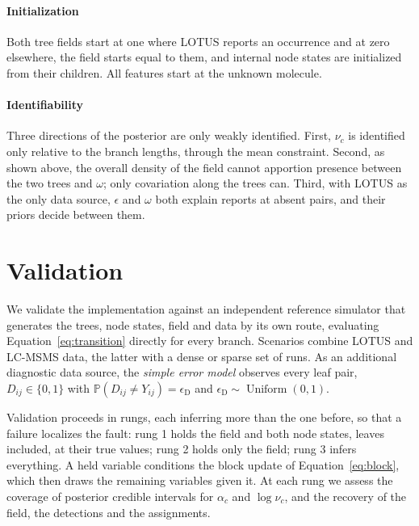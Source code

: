 \documentclass[
11pt, %
oneside, %
english, %
singlespacing, %
headsepline, %
chapterinoneline, %
]{MastersDoctoralThesis} %
\DeclareMathOperator{\Unif}{Uniform}
\def\P{\mathbb{P}}
\begin{document}
\paragraph{Initialization} Both tree fields start at one where LOTUS reports an occurrence and at zero elsewhere, the field starts equal to them, and internal node states are initialized from their children. All features start at the unknown molecule.

\paragraph{Identifiability} Three directions of the posterior are only weakly identified. First, $\nu_c$ is identified only relative to the branch lengths, through the mean constraint. Second, as shown above, the overall density of the field cannot apportion presence between the two trees and $\omega$; only covariation along the trees can. Third, with LOTUS as the only data source, $\epsilon$ and $\omega$ both explain reports at absent pairs, and their priors decide between them.

\section{Validation}

We validate the implementation against an independent reference simulator that generates the trees, node states, field and data by its own route, evaluating Equation~\eqref{eq:transition} directly for every branch. Scenarios combine LOTUS and LC-MSMS data, the latter with a dense or sparse set of runs. As an additional diagnostic data source, the \emph{simple error model} observes every leaf pair, $D_{ij} \in \{0,1\}$ with $\P(D_{ij} \neq Y_{ij}) = \epsilon_{\mathrm{D}}$ and $\epsilon_{\mathrm{D}} \sim \Unif(0,1)$.

Validation proceeds in rungs, each inferring more than the one before, so that a failure localizes the fault: rung 1 holds the field and both node states, leaves included, at their true values; rung 2 holds only the field; rung 3 infers everything. A held variable conditions the block update of Equation~\eqref{eq:block}, which then draws the remaining variables given it. At each rung we assess the coverage of posterior credible intervals for $\alpha_c$ and $\log \nu_c$, and the recovery of the field, the detections and the assignments.

\end{document}
